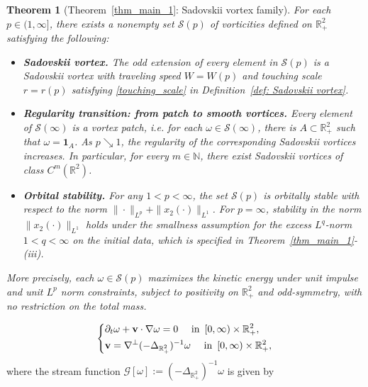 \documentclass[10pt,a4paper]{amsart}
\newtheorem{theorem}{Theorem}[section]
\theoremstyle{definition}
\theoremstyle{definition}
\numberwithin{equation}{section}
\newcommand{\0}{\emptyset}
\newcommand{\omg}{\omega}
\newcommand{\bfv}{{\bf v}}
\newcommand{\bbR}{\mathbb R}
\newcommand{\calG}{\mathcal G}
\begin{document}
\setcounter{section}{1}
\setcounter{equation}{2}
\setcounter{theorem}{1}
	\begin{theorem}[Theorem~\ref{thm_main_1}: Sadovskii vortex family]\label{thm_intro_main}
		For each $p \in (1,\infty]$, there exists a nonempty set $\mathcal{S}(p)$ of vorticities defined on $\bbR^2_+$ satisfying the following:
		\begin{itemize}[itemsep=0.8em, topsep=0.8em]
			
			\item[(i)] \textbf{Sadovskii vortex.}  	 The odd extension of every element in $\mathcal{S}(p)$ is a Sadovskii vortex with traveling speed $W=W(p)$ and touching scale $r=r(p)$ satisfying \eqref{touching_scale} in Definition~\ref{def: Sadovskii vortex}.

			
			
			\item[(ii)] \textbf{Regularity transition: from patch to smooth vortices.}  
			Every element of $\mathcal{S}(\infty)$ is a vortex patch, i.e. for each $\omg \in \mathcal{S}(\infty)$, there is $A \subset \mathbb{R}^{2}_{+}$ such that $\omg = \mathbf{1}_{A}$.
			As $p \searrow 1$, the regularity of the corresponding Sadovskii vortices increases. In particular, for every $m \in \mathbb{N}$, there exist Sadovskii vortices of class $C^m(\mathbb{R}^2)$.

			
			\item[(iii)] \textbf{{Orbital} stability.}  
			For any $1 < p < \infty$, the set $\mathcal{S}(p)$ is {orbitally} stable with respect to the norm  $\|\cdot\|_{L^p} + \|x_2(\cdot)\|_{L^1}$.
            {
            For $p = \infty$, stability in the norm $\|x_2(\cdot)\|_{L^1}$ holds under the smallness assumption for the excess $L^q$-norm $1 < q < \infty$ on the initial data, which is specified in Theorem~\ref{thm_main_1}-(iii).
            }
		\end{itemize}
		More precisely, each $\omega \in \mathcal{S}(p)$ maximizes the kinetic energy under unit impulse and unit $L^p$ norm constraints, subject to positivity on $\bbR^2_+$ and odd-symmetry, with no restriction on the total mass.
	\end{theorem}

\setcounter{section}{1}
\setcounter{equation}{4}
\setcounter{theorem}{5}
	\begin{equation}\label{eq: half Euler eq.}
		\left\{
		\begin{aligned}
			& \partial_{t}\omega + \bfv \cdot \nabla\omg = 0 \quad \mbox{ in } \,  [0,\infty)\times\bbR^2_+,\\
			& \bfv =  \nabla^\perp(-\Delta_{\bbR^2_+})^{-1}\omega \quad \mbox{ in }\, [0,\infty)\times\bbR^2_+,
		\end{aligned}
		\right.
	\end{equation} where the stream function $\calG[\omg]:=(-\Delta_{\bbR^2_+})^{-1}\omg$ is given by
\end{document}
